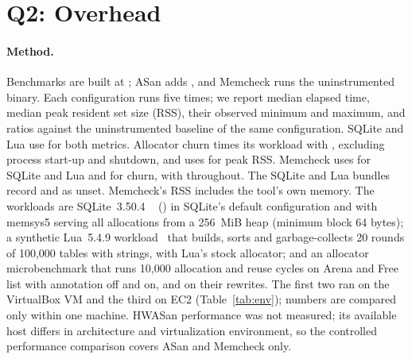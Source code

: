 \FloatBarrier
\section{Q2: Overhead}
\label{sec:perf}

\paragraph{Method.} Benchmarks are built at ; ASan adds , and Memcheck runs the uninstrumented binary. Each configuration runs five times; we report median elapsed time, median peak resident set size (RSS), their observed minimum and maximum, and ratios against the uninstrumented baseline of the same configuration. SQLite and Lua use  for both metrics. Allocator churn times its workload with , excluding process start-up and shutdown, and uses  for peak RSS. Memcheck uses  for SQLite and Lua and  for churn, with  throughout. The SQLite and Lua bundles record  and  as unset. Memcheck's RSS includes the tool's own memory. The workloads are SQLite~3.50.4 ~\cite{sqlitespeedtest} () in SQLite's default configuration and with memsys5 serving all allocations from a 256~MiB heap (minimum block 64 bytes); a synthetic Lua~5.4.9 workload~\cite{lua} that builds, sorts and garbage-collects 20 rounds of 100{,}000 tables with strings, with Lua's stock allocator; and an allocator microbenchmark that runs 10{,}000 allocation and reuse cycles on Arena and Free list with annotation off and on, and on their rewrites. The first two ran on the VirtualBox VM and the third on EC2 (Table~\ref{tab:env}); numbers are compared only within one machine. HWASan performance was not measured; its available host differs in architecture and virtualization environment, so the controlled performance comparison covers ASan and Memcheck only.

\begin{table}[!htbp]
\centering\small
\setlength{\tabcolsep}{4pt}

\caption{Tool overhead on real programs (VirtualBox VM). Time and RSS entries show the median and
[minimum, maximum] of five runs; $\times$ is the ratio of medians to the same configuration's baseline. No custom annotations.}
\label{tab:perf-tools}
\end{table}

